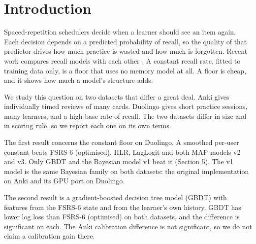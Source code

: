 \section{Introduction}
Spaced-repetition schedulers decide when a learner should see an item again.
Each decision depends on a predicted probability of recall, so the quality of that predictor drives how much practice is wasted and how much is forgotten.
Recent work compares recall models with each other \cite{settles2016trainable, ye2022stochastic, srsbenchmark}.
A constant recall rate, fitted to training data only, is a floor that uses no memory model at all.
A floor is cheap, and it shows how much a model's structure adds.

We study this question on two datasets that differ a great deal.
Anki gives individually timed reviews of many cards.
Duolingo gives short practice sessions, many learners, and a high base rate of recall.
The two datasets differ in size and in scoring rule, so we report each one on its own terms.

The first result concerns the constant floor on Duolingo.
A smoothed per-user constant beats FSRS-6 (optimised), HLR, LagLogit and both MAP models v2 and v3.
Only GBDT and the Bayesian model v1 beat it (Section 5).
The v1 model is the same Bayesian family on both datasets: the original implementation on Anki and its GPU port on Duolingo.

The second result is a gradient-boosted decision tree model (GBDT) with features from the FSRS-6 state and from the learner's own history.
GBDT has lower log loss than FSRS-6 (optimised) on both datasets, and the difference is significant on each.
The Anki calibration difference is not significant, so we do not claim a calibration gain there.

